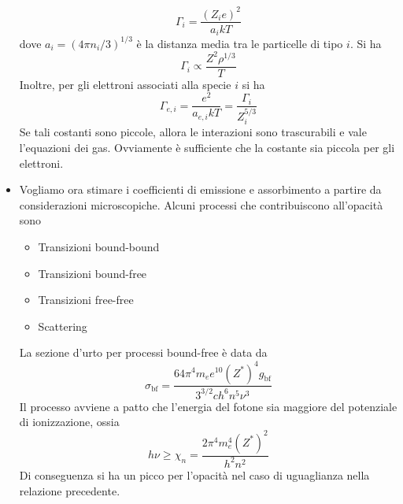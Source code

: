 \documentclass[a4paper,11pt]{article}
\theoremstyle{theorem}
\theoremstyle{definition}
\begin{document}
\begin{itemize}
		\[\Gamma_i=\frac{(Z_ie)^2}{a_ikT}\]
		dove $a_i=(4\pi n_i/3)^{1/3}$ è la distanza media tra le particelle di tipo $i$. Si ha
		\[\Gamma_i\propto\frac{Z^2\rho^{1/3}}{T}\]
		Inoltre, per gli elettroni associati alla specie $i$ si ha
		\[\Gamma_{e,i}=\frac{e^2}{a_{e,i}kT}=\frac{\Gamma_i}{Z_i^{5/3}}\]
		Se tali costanti sono piccole, allora le interazioni sono trascurabili e vale l'equazioni dei gas. Ovviamente è sufficiente che la costante sia piccola per gli elettroni.
		\item Vogliamo ora stimare i coefficienti di emissione e assorbimento a partire da considerazioni microscopiche. Alcuni processi che contribuiscono all'opacità sono
		\begin{itemize}
			\item Transizioni bound-bound
			\item Transizioni bound-free
			\item Transizioni free-free
			\item Scattering
		\end{itemize}
		La sezione d'urto per processi bound-free è data da
		\[\sigma_{\textrm{bf}}=\frac{64\pi^4m_ee^{10}(Z^*)^4g_\textrm{bf}}{3^{3/2}ch^6n^5\nu^3}\]
		Il processo avviene a patto che l'energia del fotone sia maggiore del potenziale di ionizzazione, ossia
		\[h\nu\geq\chi_n=\frac{2\pi^4m_e^4(Z^*)^2}{h^2n^2}\]
		Di conseguenza si ha un picco per l'opacità nel caso di uguaglianza nella relazione precedente.
		

\end{itemize}
\end{document}
